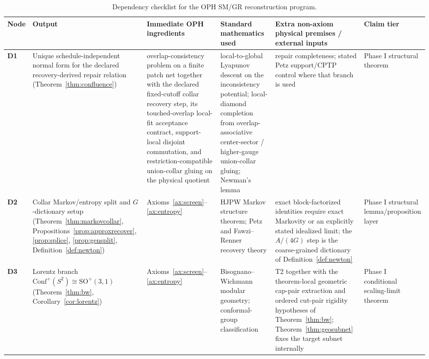 \documentclass[11pt]{article}
\newcommand{\Conf}{\mathrm{Conf}}
\begin{document}
\begingroup
\tiny
\setlength{\tabcolsep}{1pt}
\begin{longtable}{@{}>{\raggedright\arraybackslash}p{}>{\raggedright\arraybackslash}p{}>{\raggedright\arraybackslash}p{}>{\raggedright\arraybackslash}p{}>{\raggedright\arraybackslash}p{}>{\raggedright\arraybackslash}p{}@{}}
\caption{Dependency checklist for the OPH SM/GR reconstruction program.}\\
\toprule
Node & Output & Immediate OPH ingredients & Standard mathematics used & Extra non-axiom physical premises / external inputs & Claim tier \\
\midrule
\endhead
\bottomrule
\endfoot
\textbf{D1} & Unique schedule-independent normal form for the declared recovery-derived repair relation (Theorem~\ref{thm:confluence}) & overlap-consistency problem on a finite patch net together with the declared fixed-cutoff collar recovery step, its touched-overlap local-fit acceptance contract, support-local disjoint commutation, and restriction-compatible union-collar gluing on the physical quotient & local-to-global Lyapunov descent on the inconsistency potential; local-diamond completion from overlap-associative center-sector / higher-gauge union-collar gluing; Newman's lemma & repair completeness; stated Petz support/CPTP control where that branch is used & Phase I structural theorem \\
\textbf{D2} & Collar Markov/entropy split and \(G\)-dictionary setup (Theorem~\ref{thm:markovcollar}, Propositions~\ref{prop:approxrecover}, \ref{prop:splice}, \ref{prop:gensplit}, Definition~\ref{def:newton}) & Axioms~\ref{ax:screen}--\ref{ax:entropy} & HJPW Markov structure theorem; Petz and Fawzi--Renner recovery theory & exact block-factorized identities require exact Markovity or an explicitly stated idealized limit; the \(A/(4G)\) step is the coarse-grained dictionary of Definition~\ref{def:newton} & Phase I structural lemma/proposition layer \\
\textbf{D3} & Lorentz branch \(\Conf^+(S^2)\cong \mathrm{SO}^+(3,1)\) (Theorem~\ref{thm:bw}, Corollary~\ref{cor:lorentz}) & Axioms~\ref{ax:screen}--\ref{ax:entropy} & Bisognano--Wichmann modular geometry; conformal-group classification & T2 together with the theorem-local geometric cap-pair extraction and ordered cut-pair rigidity hypotheses of Theorem~\ref{thm:bw}; Theorem~\ref{thm:geosubnet} fixes the target subnet internally & Phase I conditional scaling-limit theorem \\

\end{longtable}
\end{document}
